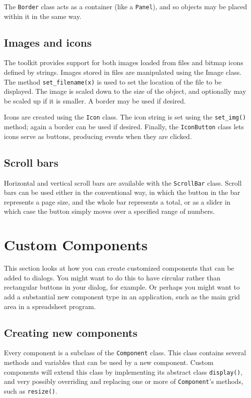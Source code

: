 The \texttt{Border} class acts as a container (like a \texttt{Panel}),
and so objects may be placed within it in the same way.

\subsection{Images and icons}

The toolkit provides support for both images loaded from files and
bitmap icons defined by strings. Images stored in files are manipulated
using the Image class. The method \texttt{set\_filename(x)} is used to
set the location of the file to be displayed. The image is scaled down
to the size of the object, and optionally may be scaled up if it is
smaller. A border may be used if desired.

Icons are created using the \texttt{Icon} class. The icon string is set
using the \texttt{set\_img()} method; again a border can be used if
desired. Finally, the \texttt{IconButton} class lets icons serve as
buttons, producing events when they are clicked.

\subsection{Scroll bars}

Horizontal and vertical scroll bars are available with the
\texttt{ScrollBar} class. Scroll bars can be used either in the
conventional way, in which the button in the bar represents a page
size, and the whole bar represents a total, or as a slider in which
case the button simply moves over a specified range of numbers.

\section{Custom Components}

This section looks at how you can create customized components that can
be added to dialogs. You might want to do this to have circular rather
than rectangular buttons in your dialog, for example. Or perhaps you
might want to add a substantial new component type in an application,
such as the main grid area in a spreadsheet program.

\subsection{Creating new components}

Every component is a subclass of the \texttt{Component}
class. This class contains several methods and variables that can be
used by a new component. Custom components will extend this class by
implementing its abstract class \texttt{display()}, and very possibly
overriding and replacing one or more of
\texttt{Component}'s methods, such as
\texttt{resize()}.

